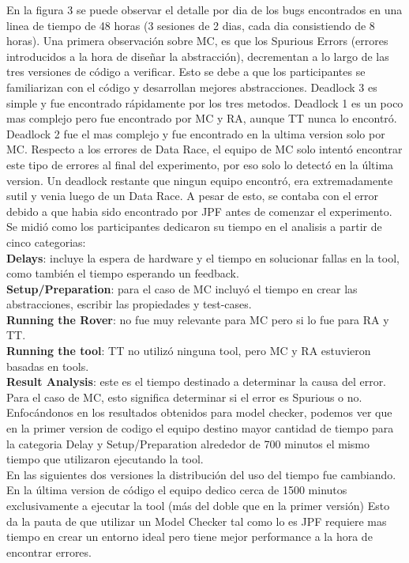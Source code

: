 \documentclass[runningheads]{llncs}
\begin{document}
En la figura 3 se puede observar el detalle por dia de los bugs encontrados en una linea de tiempo de 48 horas (3 sesiones de 2 dias, cada dia consistiendo de 8 horas). Una primera observaci\'on sobre MC, es que los Spurious Errors (errores introducidos a la hora de dise\~nar la abstracci\'on), decrementan a lo largo de las tres versiones de c\'odigo a verificar. Esto se debe a que los participantes se familiarizan con el c\'odigo y desarrollan mejores abstracciones. Deadlock 3 es simple y fue encontrado r\'apidamente por los tres metodos. Deadlock 1 es un poco mas complejo pero fue encontrado por MC y RA, aunque TT nunca lo encontr\'o. Deadlock 2 fue el mas complejo y fue encontrado en la ultima version solo por MC. Respecto a los errores de Data Race, el equipo de MC solo intent\'o encontrar este tipo de errores al final del experimento, por eso solo lo detect\'o en la \'ultima version. Un deadlock restante que ningun equipo encontr\'o, era extremadamente sutil y venia luego de un Data Race. A pesar de esto, se contaba con el error debido a que habia sido encontrado por JPF antes de comenzar el experimento.\\
Se midi\'o como los participantes dedicaron su tiempo en el analisis a partir de cinco categorias:\\
\textbf{Delays}: incluye la espera de hardware y el tiempo en solucionar fallas en la tool, como tambi\'en el tiempo esperando un feedback.\\
\textbf{Setup/Preparation}: para el caso de MC incluy\'o el tiempo en crear las abstracciones, escribir las propiedades y test-cases.\\
\textbf{Running the Rover}: no fue muy relevante para MC pero si lo fue para RA y TT.\\
\textbf{Running the tool}: TT no utiliz\'o ninguna tool, pero MC y RA estuvieron basadas en tools.\\
\textbf{Result Analysis}: este es el tiempo destinado a determinar la causa del error. Para el caso de MC, esto significa determinar si el error es Spurious o no.\\
Enfoc\'andonos en los resultados obtenidos para model checker, podemos ver que en la primer version de codigo el equipo destino mayor cantidad de tiempo para la categoria Delay y Setup/Preparation alrededor de 700 minutos el mismo tiempo que utilizaron ejecutando la tool.\\
En las siguientes dos versiones la distribuci\'on del uso del tiempo fue cambiando. En la \'ultima version de c\'odigo el equipo dedico cerca de 1500 minutos exclusivamente a ejecutar la tool (m\'as del doble que en la primer versi\'on)
Esto da la pauta de que utilizar un Model Checker tal como lo es JPF requiere mas tiempo en crear un entorno ideal pero tiene mejor performance a la hora de encontrar errores.
\end{document}
